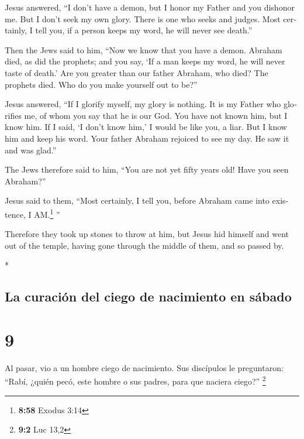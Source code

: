 \begin{paracol}{2}
\begin{otherlanguage}{english}
 Jesus answered, ``I don't have a demon, but I honor my
Father and you dishonor me.  But I don't seek my own
glory. There is one who seeks and judges.  Most
certainly, I tell you, if a person keeps my word, he will never see
death.''

 Then the Jews said to him, ``Now we know that you have a
demon. Abraham died, as did the prophets; and you say, `If a man keeps
my word, he will never taste of death.'  Are you greater
than our father Abraham, who died? The prophets died. Who do you make
yourself out to be?''

 Jesus answered, ``If I glorify myself, my glory is
nothing. It is my Father who glorifies me, of whom you say that he is
our God.  You have not known him, but I know him. If I
said, `I don't know him,' I would be like you, a liar. But I know him
and keep his word.  Your father Abraham rejoiced to see
my day. He saw it and was glad.''

 The Jews therefore said to him, ``You are not yet fifty
years old! Have you seen Abraham?''

 Jesus said to them, ``Most certainly, I tell you, before
Abraham came into existence, I AM.\footnote{\textbf{8:58} Exodus 3:14}
''

 Therefore they took up stones to throw at him, but Jesus
hid himself and went out of the temple, having gone through the middle
of them, and so passed by.

\end{otherlanguage}

\switchcolumn[0]*

\hypertarget{la-curaciuxf3n-del-ciego-de-nacimiento-en-suxe1bado}{%
\subsection{La curación del ciego de nacimiento en
sábado}\label{la-curaciuxf3n-del-ciego-de-nacimiento-en-suxe1bado}}

\hypertarget{section-16}{%
\section{9}\label{section-16}}

 Al pasar, vio a un hombre ciego de nacimiento.
 Sus discípulos le preguntaron: ``Rabí, ¿quién pecó, este
hombre o sus padres, para que naciera ciego?'' \footnote{\textbf{9:2}
  Luc 13,2}


\end{paracol}
